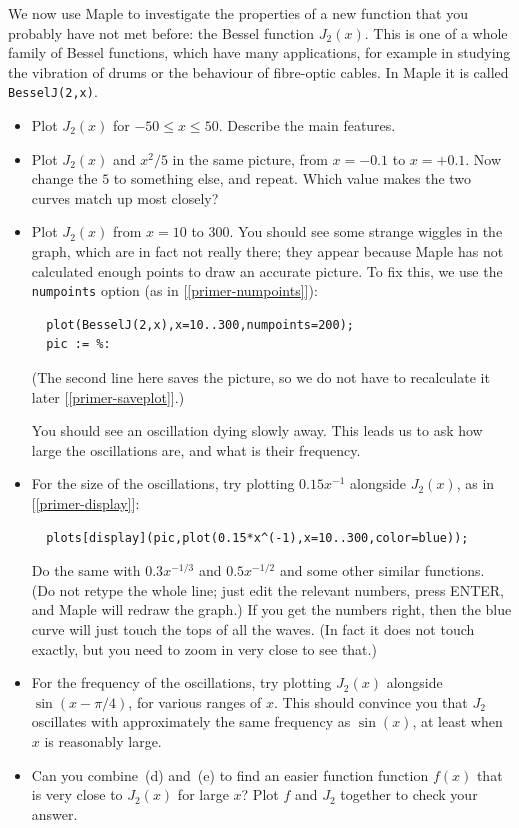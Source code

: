 \documentclass[a4paper,10pt]{amsbook}
\begin{document}
\begin{exercise}\label{ex-bessel}
 We now use Maple to investigate the properties of a new function that
 you probably have not met before: the Bessel function $J_2(x)$.  This
 is one of a whole family of Bessel functions, which have many
 applications, for example in studying the vibration of drums or the
 behaviour of fibre-optic cables.  In Maple it is called
 \verb~BesselJ(2,x)~. 
 \begin{itemize}
  \item[(a)] Plot $J_2(x)$ for $-50\leq x\leq 50$.  Describe the
   main features. 
  \item[(b)] Plot $J_2(x)$ and $x^2/5$ in the same picture, from $x=-0.1$
   to $x=+0.1$.  Now change the $5$ to something else, and repeat. 
   Which value makes the two curves match up most closely? 
  \item[(c)] Plot $J_2(x)$ from $x=10$ to $300$.  You should see some
   strange wiggles in the graph, which are in fact not really there;
   they appear because Maple has not calculated enough points to draw
   an accurate picture.  To fix this, we use the \verb~numpoints~
   option (as in [\ref{primer-numpoints}]):
\begin{verbatim}
  plot(BesselJ(2,x),x=10..300,numpoints=200);
  pic := %:
\end{verbatim}
   (The second line here saves the picture, so we do not have to
   recalculate it later [\ref{primer-saveplot}].) 

   You should see an oscillation dying slowly away.  This leads us to
   ask how large the oscillations are, and what is their frequency. 
  \item[(d)] For the size of the oscillations, try plotting $0.15x^{-1}$
   alongside $J_2(x)$, as in [\ref{primer-display}]:
\begin{verbatim}
  plots[display](pic,plot(0.15*x^(-1),x=10..300,color=blue));
\end{verbatim}
   Do the same with $0.3x^{-1/3}$ and $0.5x^{-1/2}$ and some other
   similar functions.  (Do not retype the whole line; just edit the
   relevant numbers, press ENTER, and Maple will redraw the graph.) 
   If you get the numbers right, then the blue curve will just touch
   the tops of all the waves.  (In fact it does not touch exactly, but
   you need to zoom in very close to see that.) 
  \item[(e)] For the frequency of the oscillations, try plotting
   $J_2(x)$ alongside $\sin(x-\pi/4)$, for various ranges of $x$. 
   This should convince you that $J_2$ oscillates with approximately
   the same frequency as $\sin(x)$, at least when $x$ is reasonably
   large. 
  \item[(f)] Can you combine~(d) and~(e) to find an easier function
   function $f(x)$ that is very close to $J_2(x)$ for large $x$?  Plot
   $f$ and $J_2$ together to check your answer. 
 \end{itemize}
\end{exercise}
\end{document}

